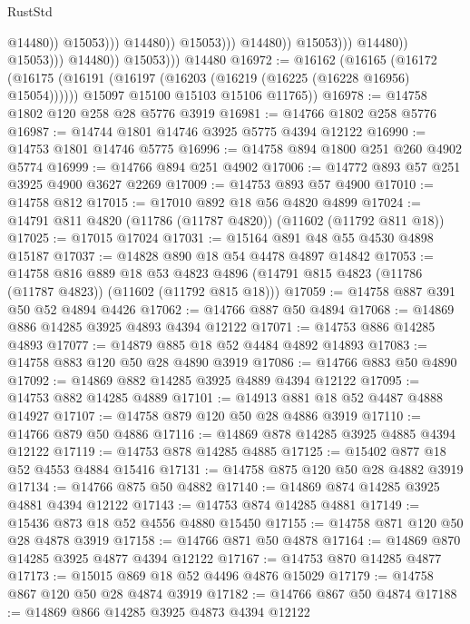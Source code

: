 \begin{lexlean}{RustStd}
\begin{coremodule}
                                                      @14480))
                                                  @15053)))
                                            @14480))
                                        @15053)))
                                  @14480))
                              @15053)))
                        @14480))
                    @15053)))
              @14480))
          @15053)))
    @14480
@16972 := @16162
    (@16165
      (@16172
        (@16175 (@16191 (@16197 (@16203 (@16219 (@16225 (@16228 @16956) @15054))))))
        @15097
        @15100
        @15103
        @15106
        @11765))
@16978 := @14758 @1802 @120 @258 @28 @5776 @3919
@16981 := @14766 @1802 @258 @5776
@16987 := @14744 @1801 @14746 @3925 @5775 @4394 @12122
@16990 := @14753 @1801 @14746 @5775
@16996 := @14758 @894 @1800 @251 @260 @4902 @5774
@16999 := @14766 @894 @251 @4902
@17006 := @14772 @893 @57 @251 @3925 @4900 @3627 @2269
@17009 := @14753 @893 @57 @4900
@17010 := @14758 @812
@17015 := @17010 @892 @18 @56 @4820 @4899
@17024 := @14791 @811 @4820 (@11786 (@11787 @4820)) (@11602 (@11792 @811 @18))
@17025 := @17015 @17024
@17031 := @15164 @891 @48 @55 @4530 @4898 @15187
@17037 := @14828 @890 @18 @54 @4478 @4897 @14842
@17053 := @14758
    @816
    @889
    @18
    @53
    @4823
    @4896
    (@14791 @815 @4823 (@11786 (@11787 @4823)) (@11602 (@11792 @815 @18)))
@17059 := @14758 @887 @391 @50 @52 @4894 @4426
@17062 := @14766 @887 @50 @4894
@17068 := @14869 @886 @14285 @3925 @4893 @4394 @12122
@17071 := @14753 @886 @14285 @4893
@17077 := @14879 @885 @18 @52 @4484 @4892 @14893
@17083 := @14758 @883 @120 @50 @28 @4890 @3919
@17086 := @14766 @883 @50 @4890
@17092 := @14869 @882 @14285 @3925 @4889 @4394 @12122
@17095 := @14753 @882 @14285 @4889
@17101 := @14913 @881 @18 @52 @4487 @4888 @14927
@17107 := @14758 @879 @120 @50 @28 @4886 @3919
@17110 := @14766 @879 @50 @4886
@17116 := @14869 @878 @14285 @3925 @4885 @4394 @12122
@17119 := @14753 @878 @14285 @4885
@17125 := @15402 @877 @18 @52 @4553 @4884 @15416
@17131 := @14758 @875 @120 @50 @28 @4882 @3919
@17134 := @14766 @875 @50 @4882
@17140 := @14869 @874 @14285 @3925 @4881 @4394 @12122
@17143 := @14753 @874 @14285 @4881
@17149 := @15436 @873 @18 @52 @4556 @4880 @15450
@17155 := @14758 @871 @120 @50 @28 @4878 @3919
@17158 := @14766 @871 @50 @4878
@17164 := @14869 @870 @14285 @3925 @4877 @4394 @12122
@17167 := @14753 @870 @14285 @4877
@17173 := @15015 @869 @18 @52 @4496 @4876 @15029
@17179 := @14758 @867 @120 @50 @28 @4874 @3919
@17182 := @14766 @867 @50 @4874
@17188 := @14869 @866 @14285 @3925 @4873 @4394 @12122

\end{coremodule}
\end{lexlean}
